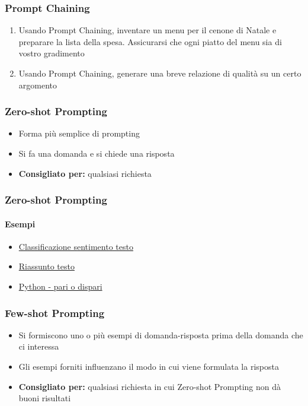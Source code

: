 \begin{exerciseframe}
    \frametitle{Prompt Chaining}

    \begin{enumerate}
        \item Usando Prompt Chaining, inventare un menu per il cenone di Natale e preparare la lista della spesa. Assicurarsi che ogni piatto del menu sia di vostro gradimento

        \bigskip
        \item Usando Prompt Chaining, generare una breve relazione di qualità su un certo argomento
    \end{enumerate}
\end{exerciseframe}



\begin{contentframe}
    \frametitle{Zero-shot Prompting}

    \begin{itemize}
        \item Forma più semplice di prompting
        \item Si fa una domanda e si chiede una risposta

        \bigskip
        \item \textbf{Consigliato per:} qualsiasi richiesta
    \end{itemize}
\end{contentframe}

\begin{exampleframe}
    \frametitle{Zero-shot Prompting}
    \framesubtitle{Esempi}

    \begin{itemize}
        \item \href{https://chatgpt.com/share/675c4511-aa20-8003-ae94-2f77b3d3c6ad}{Classificazione sentimento testo}
        \item \href{https://chatgpt.com/share/675c46c2-8cec-8003-ba2f-434327e1fd49}{Riassunto testo}
        \item \href{https://chatgpt.com/share/675c4751-8c98-8003-aeb7-eeb3aeb805f2}{Python - pari o dispari}
    \end{itemize}
\end{exampleframe}

\begin{contentframe}
    \frametitle{Few-shot Prompting}

    \begin{itemize}
        \item Si formiscono uno o più esempi di domanda-risposta prima della domanda che ci interessa
        \item Gli esempi forniti influenzano il modo in cui viene formulata la risposta

        \bigskip
        \item \textbf{Consigliato per:} qualsiasi richiesta in cui Zero-shot Prompting non dà buoni risultati
    \end{itemize}
\end{contentframe}

